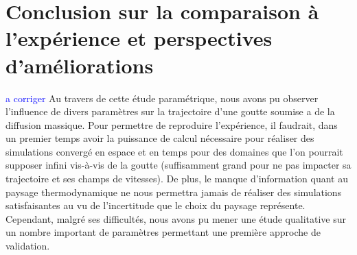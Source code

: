 \section{Conclusion sur la comparaison à l'expérience et perspectives d'améliorations}
\textcolor{blue}{a corriger}
Au travers de cette étude paramétrique, nous avons pu observer l'influence de divers paramètres sur la trajectoire d'une goutte soumise a de la diffusion massique. Pour permettre de reproduire l'expérience, il faudrait, dans un premier temps avoir la puissance de calcul nécessaire pour réaliser des simulations convergé en espace et en temps pour des domaines que l'on pourrait supposer infini vis-à-vis de la goutte (suffisamment grand pour ne pas impacter sa trajectoire et ses champs de vitesses). De plus, le manque d'information quant au paysage thermodynamique ne nous permettra jamais de réaliser des simulations satisfaisantes au vu de l'incertitude que le choix du paysage représente. Cependant, malgré ses difficultés, nous avons pu mener une étude qualitative sur un nombre important de paramètres permettant une première approche de validation.

